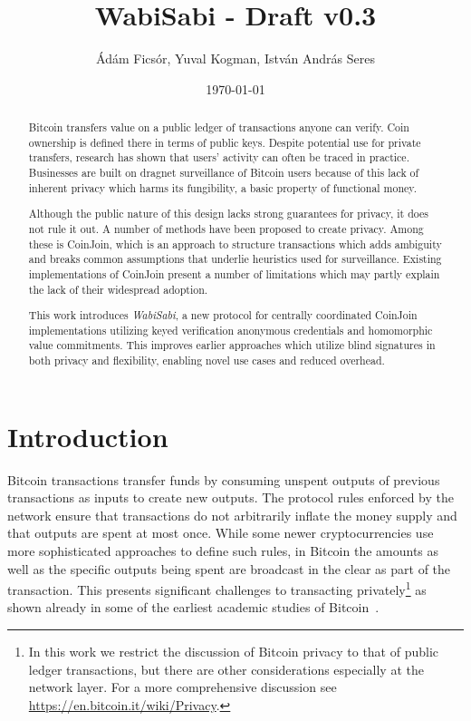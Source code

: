 \documentclass{article}
\title{WabiSabi - Draft v0.3}
\author{Ádám Ficsór, Yuval Kogman, István András Seres}
\date{\today}
\begin{document}
\maketitle

\begin{abstract}
  Bitcoin transfers value on a public ledger of transactions anyone can verify. Coin ownership is defined there in terms of public keys.
  Despite potential use for private transfers, research has shown that users' activity can often be traced in practice. Businesses are built on dragnet surveillance of Bitcoin users because of this lack of inherent privacy which harms its fungibility, a basic property of functional money.

  Although the public nature of this design lacks strong guarantees for privacy, it does not rule it out.
  A number of methods have been proposed to create privacy. Among these is CoinJoin, which is an approach to structure transactions which adds ambiguity and breaks common assumptions that underlie heuristics used for surveillance.
  Existing implementations of CoinJoin present a number of limitations which may partly explain the lack of their widespread adoption.

  This work introduces \emph{WabiSabi}, a new protocol for centrally coordinated CoinJoin implementations utilizing keyed verification anonymous credentials and homomorphic value commitments. This improves earlier approaches which utilize blind signatures in both privacy and flexibility, enabling novel use cases and reduced overhead.
\end{abstract}

\section{Introduction}

Bitcoin transactions transfer funds by consuming unspent outputs of previous transactions as inputs to create new outputs. The protocol rules enforced by the network ensure that transactions do not arbitrarily inflate the money supply and that outputs are spent at most once. While some newer cryptocurrencies use more sophisticated approaches to define such rules, in Bitcoin the amounts as well as the specific outputs being spent are broadcast in the clear as part of the transaction. This presents significant challenges to transacting privately\footnote{In this work we restrict the discussion of Bitcoin privacy to that of public ledger transactions, but there are other considerations especially at the network layer. For a more comprehensive discussion see \url{https://en.bitcoin.it/wiki/Privacy}.} as shown already in some of the earliest academic studies of Bitcoin~\cite{reid2013analysis,ron2013quantitative,androulaki2013evaluating,ober2013structure,moeser2013inquiry,meiklejohn2013fistful}.
\end{document}
